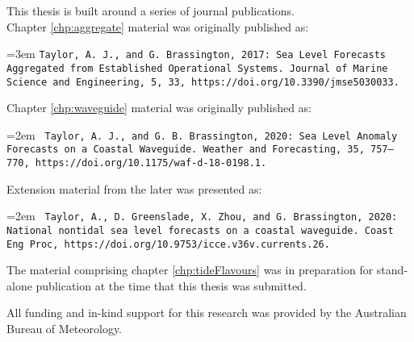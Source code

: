 
\begin{preface}

\noindent
This thesis is built around a series of journal publications. \\
Chapter \ref{chp:aggregate} material was originally published as:

\vspace{5mm}
\hangindent=3em
\texttt{Taylor, A. J., and G. Brassington, 2017: Sea Level Forecasts Aggregated from Established Operational Systems. Journal of Marine Science and Engineering, 5, 33, https://doi.org/10.3390/jmse5030033.}


\vspace{5mm}
\noindent
Chapter \ref{chp:waveguide} material was originally published as:

\vspace{5mm}
\hangindent=2em
\texttt{
Taylor, A. J., and G. B. Brassington, 2020: Sea Level Anomaly Forecasts on a Coastal Waveguide. Weather and Forecasting, 35, 757–770, https://doi.org/10.1175/waf-d-18-0198.1.}

\vspace{5mm}
\noindent
Extension material from the later was presented as:

\vspace{5mm}
\hangindent=2em
\texttt{
Taylor, A., D. Greenslade, X. Zhou, and G. Brassington, 2020: National nontidal sea level forecasts on a coastal waveguide. Coast Eng Proc, https://doi.org/10.9753/icce.v36v.currents.26.}

\vspace{5mm}
\noindent
The material comprising chapter \ref{chp:tideFlavours} was in preparation for stand-alone publication at the time that this thesis was submitted.

\vspace{5mm}
\noindent 
All funding and in-kind support for this research was provided by the Australian Bureau of Meteorology.

\end{preface}

